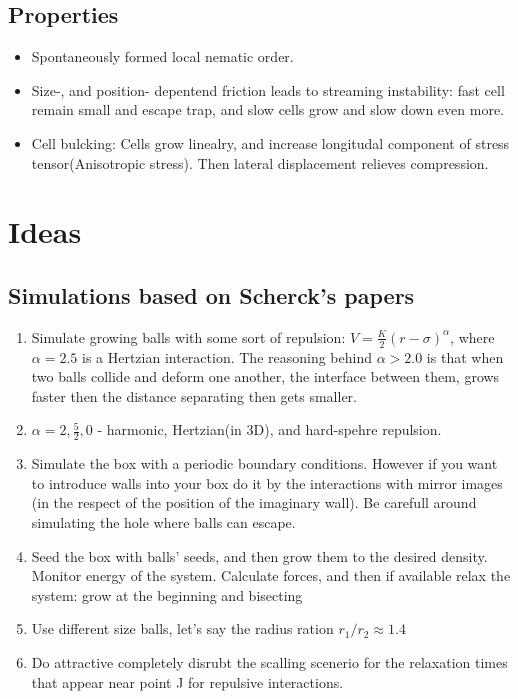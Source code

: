 \documentclass[10pt,a4paper]{article}
\begin{document}
\subsection{Properties}
\begin{itemize}
 \item Spontaneously formed local nematic order.
 \item Size-, and position- depentend friction leads to streaming instability: fast cell remain small and escape trap, and slow cells grow and slow down even more.
 \item Cell bulcking: Cells grow linealry, and increase longitudal component of stress tensor(Anisotropic stress). 
 Then lateral displacement relieves compression.
\end{itemize}



\section{Ideas}
\subsection{Simulations based on Scherck's papers}
\begin{enumerate}
 \item Simulate growing balls with some sort of repulsion: $V = \frac{K}{2}(r-\sigma)^{\alpha}$, where $\alpha=2.5$ is a Hertzian interaction.
 The reasoning behind $\alpha >2.0$ is that when two balls collide and deform one another, 
 the  interface between them, grows faster then the distance separating then gets smaller.
 \item $\alpha=2,\frac{5}{2},0$ - harmonic, Hertzian(in 3D), and hard-spehre repulsion.
 \item Simulate the box with a periodic boundary conditions. However if you want to introduce walls into your box
 do it by the interactions with mirror images (in the respect of the position of the imaginary wall). Be carefull
 around simulating the hole where balls can escape. 
 \item Seed the box with balls' seeds, and then grow them to the desired density.
 Monitor energy of the system. Calculate forces, and then if available relax the system: grow at the beginning and bisecting 
 \item Use different size balls, let's say the radius ration $r_1/r_2 \approx 1.4$
 \item Do attractive completely disrubt the scalling scenerio for the relaxation times that appear near point J for repulsive interactions.
 
\end{enumerate}
\end{document}
